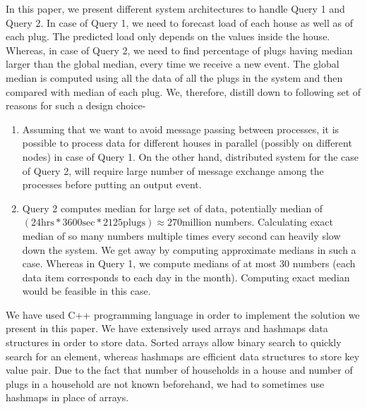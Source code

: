 In this paper, we present different system architectures to handle Query 1 and Query 2. In case of Query 1, we need to forecast load of each house as well as of each plug. The predicted load only depends on the values inside the house. Whereas, in case of Query 2, we need to find percentage of plugs having median larger than the global median, every time we receive a new event. The global median is computed using all the data of all the plugs in the system and then compared with median of each plug. We, therefore, distill down to following set of reasons for such a design choice-

\begin{enumerate}
\item Assuming that we want to avoid message passing between processes, it is possible to process data for different houses in parallel (possibly on different nodes) in case of Query 1. On the other hand, distributed system for the case of Query 2, will require large number of message exchange among the processes before putting an output event.
\item Query 2 computes median for large set of data, potentially median of $(24 \mbox{hrs} * 3600 \mbox{sec} * 2125 \mbox{plugs}) \approx 270 \mbox{million}$ numbers. Calculating exact median of so many numbers multiple times every second can heavily slow down the system. We get away by computing approximate medians in such a case. Whereas in Query 1, we compute medians of at most 30 numbers (each data item corresponds to each day in the month). Computing exact median would be feasible in this case.
\end{enumerate}

We have used C++ programming language in order to implement the solution we present in this paper. We have extensively used arrays and hashmaps data structures in order to store data. Sorted arrays allow binary search to quickly search for an element, whereas hashmaps are efficient data structures to store key value pair. Due to the fact that number of households in a house and number of plugs in a household are not known beforehand, we had to sometimes use hashmaps in place of arrays.
